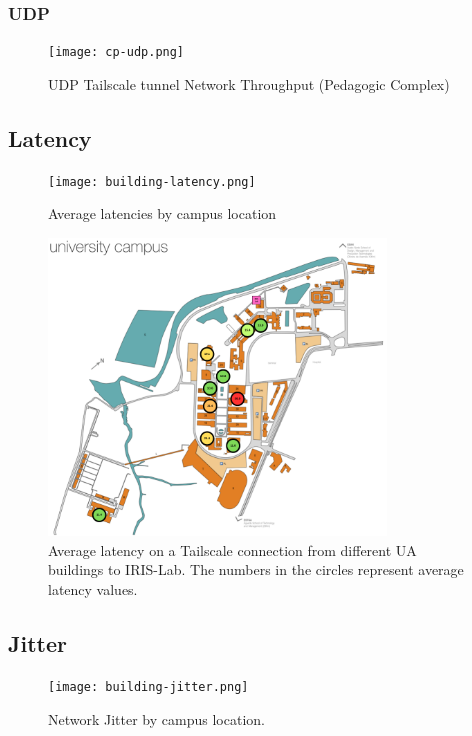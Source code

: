 \documentclass[11pt,twoside,a4paper]{report}
\begin{document}
\subsubsection{UDP}

\begin{figure}[h]
\centering
  \texttt{[image: cp-udp.png]}
  \caption{UDP Tailscale tunnel Network Throughput (Pedagogic Complex)}
  \label{fig:tcptplibrary}
\end{figure}

\subsection{Latency}

\begin{figure}[h]
\centering
  \texttt{[image: building-latency.png]}
  \caption{Average latencies by campus location}
  \label{fig:udptpcp}
\end{figure}


\begin{figure}[h]
\centering
\includegraphics[width=0.8\textwidth]{ua-latency.png}
\caption{Average latency on a Tailscale connection from different UA buildings to IRIS-Lab. The numbers in the circles represent average latency values.}
\label{fig:ualats}
\end{figure}


\subsection{Jitter}

\begin{figure}[h]
\centering
  \texttt{[image: building-jitter.png]}
  \caption{Network Jitter by campus location.}
  \label{fig:uajitter}
\end{figure}
\end{document}
